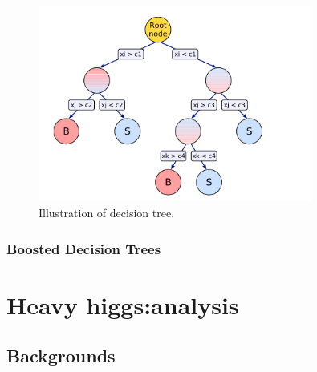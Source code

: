\begin{figure}
\begin{center}
\includegraphics[width=0.8\textwidth,keepaspectratio]{plots_and_figures/chapter5/decision_tree.png}
\caption{Illustration of decision tree.~\cite{tmva_manual}}
\label{fig:dec_tree}
\end{center}
\end{figure}




\subsubsection{Boosted Decision Trees}
\label{bdts}


\section{Heavy higgs:\Hmue analysis}
\label{hh_evt_selec}

\subsection{Backgrounds}
\label{hh_evt_sel_bkg}









%
% 
% 

